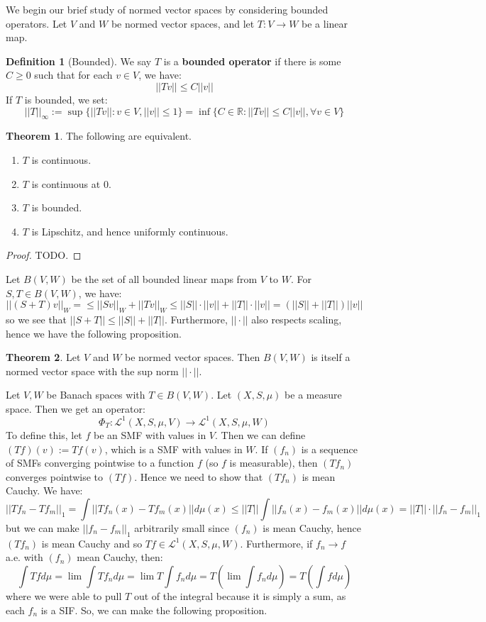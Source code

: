 \documentclass[11pt, oneside]{amsart}   	%
\theoremstyle{definition}
\newtheorem{definition}{Definition}[section]
\newtheorem{theorem}{Theorem}[section]
\begin{document}
	We begin our brief study of normed vector spaces by considering bounded operators. Let $V$ and $W$ be normed 
	vector spaces, and let $T : V\rightarrow W$ be a linear map.
	
	\begin{definition}[Bounded]
		We say $T$ is a \textbf{bounded operator} if there is some $C\geq 0$ such that for each $v\in V$, we have:
		$$
			||Tv||\leq C||v||
		$$
		If $T$ is bounded, we set:
		$$
			||T||_\infty := \sup\{||Tv|| : v\in V, ||v||\leq 1\} = \inf\{C\in\mathbb R : ||Tv||\leq C||v||,\forall v\in V\}
		$$
	\end{definition}
	
	\begin{theorem}
		The following are equivalent.
		\begin{enumerate}
			\item $T$ is continuous.
			\item $T$ is continuous at $0$.
			\item $T$ is bounded.
			\item $T$ is Lipschitz, and hence uniformly continuous.
		\end{enumerate}
	\end{theorem}
	
	\begin{proof}
		TODO.
	\end{proof}
	
	Let $B(V, W)$ be the set of all bounded linear maps from $V$ to $W$. For $S, T\in B(V, W)$, we have:
	$$
		||(S + T)v||_W = \leq ||Sv||_W + ||Tv||_W\leq ||S||\cdot ||v|| + ||T||\cdot||v|| = (||S|| + ||T||)||v||
	$$
	so we see that $||S + T||\leq ||S|| + ||T||$. Furthermore, $||\cdot||$ also respects scaling, hence we have the following 
	proposition.
	
	\begin{theorem}
		Let $V$ and $W$ be normed vector spaces. Then $B(V, W)$ is itself a normed vector space with the sup norm 
		$||\cdot||$. 
	\end{theorem}
	
	Let $V, W$ be Banach spaces with $T\in B(V, W)$. Let $(X, S, \mu)$ be a measure space. Then we get an operator:
	$$
		\Phi_T : \mathcal L^1(X, S, \mu, V)\rightarrow\mathcal L^1(X, S, \mu, W)
	$$
	To define this, let $f$ be an SMF with values in $V$. Then we can define $(Tf)(v) := Tf(v)$, which is a SMF with values 
	in $W$. If $(f_n)$ is a sequence of SMFs converging pointwise to a function $f$ (so $f$ is measurable), then $(Tf_n)$ 
	converges pointwise to $(Tf)$. Hence we need to show that $(Tf_n)$ is mean Cauchy. We have:
	$$
		||Tf_n - Tf_m||_1 = \int ||Tf_n(x) - Tf_m(x)||d\mu(x)\leq ||T||\int ||f_n(x) - f_m(x)||d\mu(x) = ||T||\cdot ||f_n - f_m||_1
	$$
	but we can make $||f_n - f_m||_1$ arbitrarily small since $(f_n)$ is mean Cauchy, hence $(Tf_n)$ is mean Cauchy and 
	so $Tf\in\mathcal L^1(X, S, \mu, W)$. Furthermore, if $f_n\rightarrow f$ a.e. with $(f_n)$ mean Cauchy, then:
	$$
		\int Tfd\mu = \lim\int Tf_nd\mu = \lim T\int f_nd\mu = T(\lim\int f_nd\mu) = T(\int fd\mu)
	$$
	where we were able to pull $T$ out of the integral because it is simply a sum, as each $f_n$ is a SIF. So, we can 
	make the following proposition.
	
\end{document}
